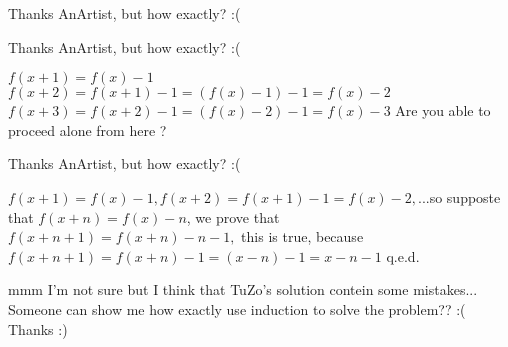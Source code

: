 \begin{solution}
	Thanks AnArtist, but how exactly? :(
\end{solution}



\begin{solution}
	\begin{tcolorbox}Thanks AnArtist, but how exactly? :(\end{tcolorbox}

$f(x+1)=f(x)-1$
$f(x+2)=f(x+1)-1=(f(x)-1)-1=f(x)-2$
$f(x+3)=f(x+2)-1=(f(x)-2)-1=f(x)-3$
 Are you able to proceed alone from here ?
\end{solution}



\begin{solution}
	\begin{tcolorbox}Thanks AnArtist, but how exactly? :(\end{tcolorbox}

$f(x+1)=f(x)-1,f(x+2)=f(x+1)-1=f(x)-2,$...so supposte that $f(x+n)=f(x)-n$, we prove that $f(x+n+1)=f(x+n)-n-1,$ this is true, because $f(x+n+1)=f(x+n)-1=(x-n)-1=x-n-1$ q.e.d. 

\end{solution}



\begin{solution}
	mmm I'm not sure but I think that TuZo's solution contein some mistakes...
Someone can show me how exactly use induction to solve the problem?? :(
Thanks :)
\end{solution}






